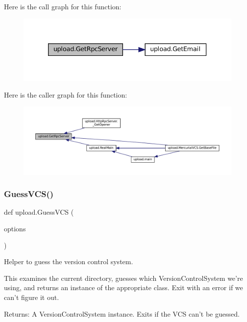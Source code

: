 Here is the call graph for this function\+:
\nopagebreak
\begin{figure}[H]
\begin{center}
\leavevmode
\includegraphics[width=333pt]{namespaceupload_a1dadef480a702dbc5d0fb66203b9abe7_cgraph}
\end{center}
\end{figure}
Here is the caller graph for this function\+:
\nopagebreak
\begin{figure}[H]
\begin{center}
\leavevmode
\includegraphics[width=350pt]{namespaceupload_a1dadef480a702dbc5d0fb66203b9abe7_icgraph}
\end{center}
\end{figure}
\mbox{\label{namespaceupload_a31390568253accd22ee51861eaeb99bd}} 
\subsubsection{\texorpdfstring{Guess\+V\+C\+S()}{GuessVCS()}}
{\footnotesize\ttfamily def upload.\+Guess\+V\+CS (\begin{DoxyParamCaption}\item[{}]{options }\end{DoxyParamCaption})}

\begin{DoxyVerb}Helper to guess the version control system.

This examines the current directory, guesses which VersionControlSystem
we're using, and returns an instance of the appropriate class.  Exit with an
error if we can't figure it out.

Returns:
  A VersionControlSystem instance. Exits if the VCS can't be guessed.
\end{DoxyVerb}
 


